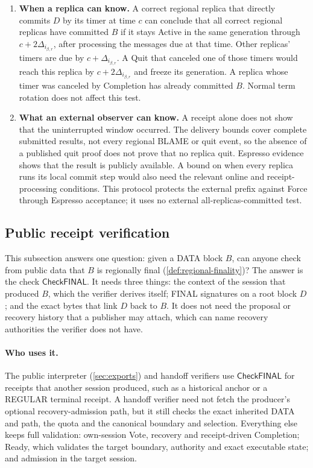 \documentclass[11pt,a4paper]{article}
\newcommand{\tagg}[1]{\ensuremath{\mathsf{#1}}}
\newcounter{protocol}
\begin{document}
\begin{enumerate}[label=(\arabic*),itemsep=4pt]
\item \textbf{When a replica can know.} A correct regional replica that
directly commits $D$ by its timer at time $c$ can conclude that all
correct regional replicas have committed $B$ if it stays Active in the
same generation through $c+2\Delta_{i_{\beta,r}}$, after processing the
messages due at that time. Other replicas' timers are due by
$c+\Delta_{i_{\beta,r}}$. A Quit that canceled one of those timers would
reach this replica by $c+2\Delta_{i_{\beta,r}}$ and freeze its
generation. A replica whose timer was canceled by Completion has already
committed $B$. Normal term rotation does not affect this test.

\item \textbf{What an external observer can know.} A receipt alone does
not show that the uninterrupted window occurred. The delivery bounds
cover complete submitted results, not every regional BLAME or quit event,
so the absence of a published quit proof does not prove that no replica
quit. Espresso evidence shows that the result is publicly available. A
bound on when every replica runs its local commit step would also need
the relevant online and receipt-processing conditions. This protocol
protects the external prefix against Force through Espresso acceptance;
it uses no external all-replicas-committed test.
\end{enumerate}

\subsection{Public receipt verification}
\label{sec:receipt-kernel}
This subsection answers one question: given a DATA block $B$, can anyone
check from public data that $B$ is regionally final
(\cref{def:regional-finality})? The answer is the check
$\tagg{CheckFINAL}$. It needs three things: the context of the session
that produced $B$, which the verifier derives itself; FINAL signatures
on a root block $D$; and the exact bytes that link $D$ back to $B$. It
does not need the proposal or recovery history that a publisher may
attach, which can name recovery authorities the verifier does not have.

\paragraph{Who uses it.}
The public interpreter (\cref{sec:exports}) and handoff verifiers use
$\tagg{CheckFINAL}$ for receipts that another session produced, such as
a historical anchor or a REGULAR terminal receipt. A handoff verifier
need not fetch the producer's optional recovery-admission path, but it
still checks the exact inherited DATA and path, the quota and the
canonical boundary and selection. Everything else keeps full
validation: own-session Vote, recovery and receipt-driven Completion;
Ready, which validates the target boundary, authority and exact
executable state; and admission in the target session.
\end{document}
